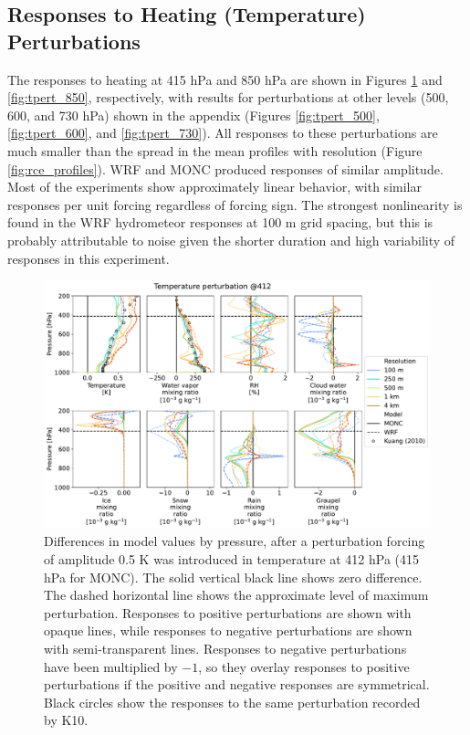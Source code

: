 \documentclass[draft]{agujournal2019}
\begin{document}
\subsection{Responses to Heating (Temperature) Perturbations}

The responses to heating at 415 hPa and 850 hPa are shown in Figures
\ref{fig:tpert_412} and \ref{fig:tpert_850}, respectively, with results for
perturbations at other levels (500, 600, and 730 hPa) shown in the appendix
(Figures \ref{fig:tpert_500}, \ref{fig:tpert_600}, and \ref{fig:tpert_730}). All
responses to these perturbations are much smaller than the spread in the mean
profiles with resolution (Figure \ref{fig:rce_profiles}). WRF and MONC produced
responses of similar amplitude. Most of the experiments show approximately
linear behavior, with similar responses per unit forcing regardless of forcing
sign. The strongest nonlinearity is found in the WRF hydrometeor responses at
100 m grid spacing, but this is probably attributable to noise given the shorter
duration and high variability of responses in this experiment.

\begin{figure}[pth]
    \noindent\includegraphics[width=\textwidth]{figures/pert_diffs_T_0.5_@412}
    \caption{Differences in model values by pressure, after a perturbation
    forcing of amplitude 0.5 K was introduced in temperature at 412 hPa (415 hPa
    for MONC). The solid vertical black line shows zero difference. The dashed
    horizontal line shows the approximate level of maximum perturbation.
    Responses to positive perturbations are shown with opaque lines, while
    responses to negative perturbations are shown with semi-transparent lines.
    Responses to negative perturbations have been multiplied by $-1$, so they
    overlay responses to positive perturbations if the positive and negative
    responses are symmetrical. Black circles show the responses to the same
    perturbation recorded by K10.}
    \label{fig:tpert_412}
\end{figure}
\end{document}
